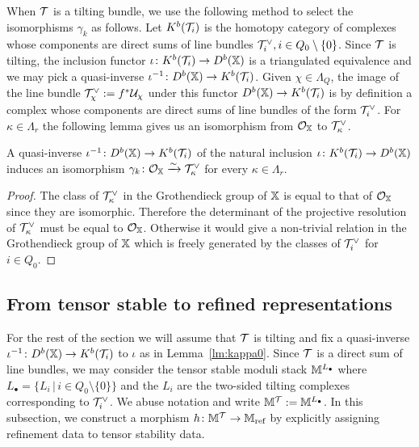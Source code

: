 \documentclass[12pt]{amsart}
\begin{document}
When $\mathcal{T}$ is a tilting bundle, we use the following method to select the isomorphisms $\gamma_k$ as follows. Let $K^b(\mathcal{T}_i)$ is the homotopy category of complexes whose components are direct sums of line bundles $\mathcal{T}_i^\vee, i \in Q_0 \setminus \{0\}$. Since $\mathcal{T}$ is tilting, the inclusion functor $\iota \colon K^b(\mathcal{T}_i) \rightarrow D^b(\mathbb{X})$ is a triangulated equivalence and we may pick a quasi-inverse $\iota^{-1} \colon D^b(\mathbb{X}) \to K^b(\mathcal{T}_i)$. 
Given $\chi \in \Lambda_{Q}$, the image of the line bundle $\mathcal{T}_\chi^\vee:= f^* \mathcal{U}_\chi$ under this functor $D^b(\mathbb{X}) \rightarrow K^b(\mathcal{T}_i)$ is by definition a complex whose components are direct sums of line bundles of the form $\mathcal{T}_i^\vee$.
For $\kappa \in \Lambda_r$ the following lemma gives us an isomorphism from $\mathcal{O}_{\mathbb{X}}$ to $\mathcal{T}_\kappa^\vee$.

\begin{lemma}\label{lm:kappa0}
A quasi-inverse $\iota^{-1} \colon D^b(\mathbb{X}) \rightarrow K^b(\mathcal{T}_i)$ of the natural inclusion $\iota\colon K^b(\mathcal{T}_i) \rightarrow D^b(\mathbb{X})$ induces an isomorphism $\gamma_k\colon \mathcal{O}_{\mathbb{X}} \xrightarrow{\sim}\mathcal{T}_\kappa^\vee$ for every  $\kappa \in \Lambda_r$.
\end{lemma}

\begin{proof}
The class of $\mathcal{T}_\kappa^\vee$ in the Grothendieck group of $\mathbb{X}$ is equal to that of $\mathcal{O}_{\mathbb{X}}$ since they are isomorphic.
Therefore the determinant of the projective resolution of $\mathcal{T}_\kappa^\vee$ must be equal to $\mathcal{O}_{\mathbb{X}}$. 
Otherwise it would give a non-trivial relation in the Grothendieck group of $\mathbb{X}$ which is freely generated by the classes of $\mathcal{T}_i^\vee$ for $i\in Q_0$.
\end{proof}

\subsection{From tensor stable to refined representations} \label{ssc:pictoref}
For the rest of the section we will assume that $\mathcal{T}$ is tilting and fix a quasi-inverse $\iota^{-1} \colon D^b(\mathbb{X}) \rightarrow K^b(\mathcal{T}_i)$ to $\iota$ as in Lemma~\ref{lm:kappa0}. Since $\mathcal{T}$ is a direct sum of line bundles, we may consider the tensor stable moduli stack $\mathbb{M}^{L_{\bullet}}$ where $L_{\bullet} = \{ L_i \,|\, i \in Q_0 \setminus \{0\}\}$ and the $L_i$ are the two-sided tilting complexes corresponding to $\mathcal{T}_i^\vee$. We abuse notation and write $\mathbb{M}^{\mathcal{T}}:= \mathbb{M}^{L_{\bullet}}$. 
In this subsection, we construct a morphism $h \colon \mathbb{M}^{\mathcal{T}} \to \mathbb{M}_{\text{ref}}$ by explicitly assigning refinement data to tensor stability data.
\end{document}
